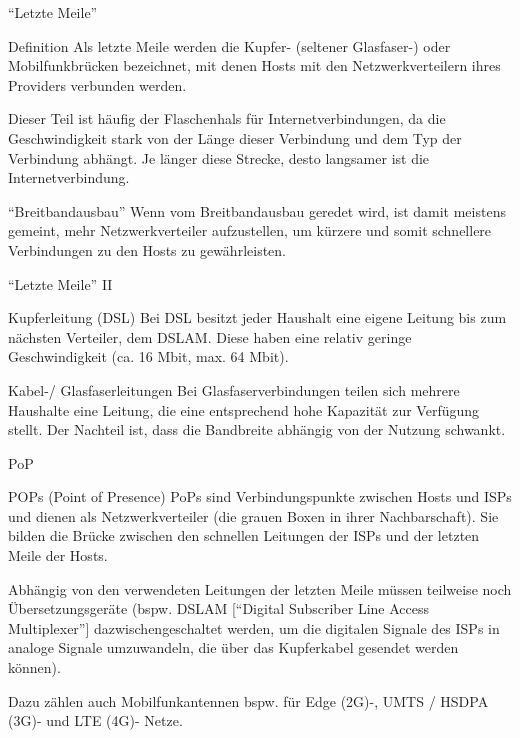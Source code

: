 \documentclass[hyperref={colorlinks,linkcolor=white}, utf8]{beamer}
\begin{document}
	\begin{frame}{\enquote{Letzte Meile}}
		\begin{block}{Definition}
			Als letzte Meile werden die Kupfer- (seltener Glasfaser-) oder Mobilfunkbrücken bezeichnet, mit denen Hosts mit den Netzwerkverteilern ihres Providers verbunden werden. 
			
			\small Dieser Teil ist häufig der Flaschenhals für Internetverbindungen, da die Geschwindigkeit stark von der Länge dieser Verbindung und dem Typ der Verbindung abhängt. Je länger diese Strecke, desto langsamer ist die Internetverbindung.
		\end{block}
		
		\begin{exampleblock}{\enquote{Breitbandausbau}}
			Wenn vom Breitbandausbau geredet wird, ist damit meistens gemeint, mehr Netzwerkverteiler aufzustellen, um kürzere und somit schnellere Verbindungen zu den Hosts zu gewährleisten.
		\end{exampleblock}	
	\end{frame}

	\begin{frame}{\enquote{Letzte Meile} II}
		\begin{block}{Kupferleitung (DSL)}
			Bei DSL besitzt jeder Haushalt eine eigene Leitung bis zum nächsten Verteiler, dem DSLAM. Diese haben eine relativ geringe Geschwindigkeit (ca. 16 Mbit, max. 64 Mbit).
		\end{block}
		
		\begin{block}{Kabel-/ Glasfaserleitungen}
			Bei Glasfaserverbindungen teilen sich mehrere Haushalte eine Leitung, die eine entsprechend hohe Kapazität zur Verfügung stellt. Der Nachteil ist, dass die Bandbreite abhängig von der Nutzung schwankt.
		\end{block}
	\end{frame}
	
	\begin{frame}{PoP}
		\begin{block}{POPs (Point of Presence)}
			PoPs sind Verbindungspunkte zwischen Hosts und ISPs und dienen als Netzwerkverteiler (die grauen Boxen in ihrer Nachbarschaft). Sie bilden die Brücke zwischen den schnellen Leitungen der ISPs und der letzten Meile der Hosts. 
			
			Abhängig von den verwendeten Leitungen der letzten Meile müssen teilweise noch Übersetzungsgeräte (bspw. DSLAM [\enquote{Digital Subscriber Line Access Multiplexer}] dazwischengeschaltet werden, um die digitalen Signale des ISPs in analoge Signale umzuwandeln, die über das Kupferkabel gesendet werden können).
		\end{block}
		
		Dazu zählen auch Mobilfunkantennen bspw. für Edge (2G)-, UMTS / HSDPA (3G)- und LTE (4G)- Netze.
	\end{frame}
	
\end{document}
